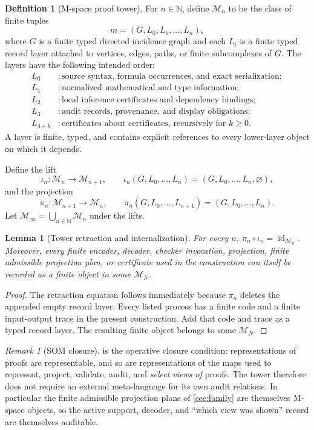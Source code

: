 \documentclass[11pt]{article}
\newcommand{\N}{\mathbb N}
\newcommand{\M}{\mathcal M}
\theoremstyle{plain}
\newtheorem{lemma}[theorem]{Lemma}
\theoremstyle{definition}
\newtheorem{definition}[theorem]{Definition}
\theoremstyle{remark}
\newtheorem{remark}[theorem]{Remark}
\begin{document}
\begin{definition}[M-space proof tower]
\label{def:mtower}
For $n\in\N$, define $\M_n$ to be the class of finite tuples
\[
  m=(G, L_0,L_1,\ldots,L_n),
\]
where $G$ is a finite typed directed incidence graph and each $L_i$ is a finite typed record layer attached to vertices, edges, paths, or finite subcomplexes of $G$.  The layers have the following intended order:
\begin{align*}
L_0&: \text{source syntax, formula occurrences, and exact serialization};\\
L_1&: \text{normalized mathematical and type information};\\
L_2&: \text{local inference certificates and dependency bindings};\\
L_3&: \text{audit records, provenance, and display obligations};\\
L_{4+k}&: \text{certificates about certificates, recursively for }k\geq 0.
\end{align*}
A layer is finite, typed, and contains explicit references to every lower-layer object on which it depends.

Define the lift
\[
  \iota_n:\M_n\to\M_{n+1},\qquad
  \iota_n(G,L_0,\ldots,L_n)=(G,L_0,\ldots,L_n,\varnothing),
\]
and the projection
\[
  \pi_n:\M_{n+1}\to\M_n,\qquad
  \pi_n(G,L_0,\ldots,L_{n+1})=(G,L_0,\ldots,L_n).
\]
Let $\M_\infty=\bigcup_{n\in\N}\M_n$ under the lifts.
\end{definition}

\begin{lemma}[Tower retraction and internalization]
\label{lem:tower}
For every $n$, $\pi_n\circ\iota_n=\operatorname{id}_{\M_n}$.  Moreover,
every finite encoder, decoder, checker invocation, projection, finite admissible
projection plan, or certificate used in the construction can itself be recorded
as a finite object in some $\M_N$.
\end{lemma}

\begin{proof}
The retraction equation follows immediately because $\pi_n$ deletes the appended empty record layer.  Every listed process has a finite code and a finite input-output trace in the present construction.  Add that code and trace as a typed record layer.  The resulting finite object belongs to some $\M_N$.
\end{proof}

\begin{remark}[SOM closure]
\label{rem:somclosure}
 is the operative closure condition: representations of proofs are representable, and so are representations of the maps used to represent, project, validate, audit, and \emph{select views of} proofs.  The tower therefore does not require an external meta-language for its own audit relations.  In particular the finite admissible projection plans of \cref{sec:family}
are themselves M-space objects, so the active support, decoder, and ``which
view was shown'' record are themselves auditable.
\end{remark}
\end{document}
